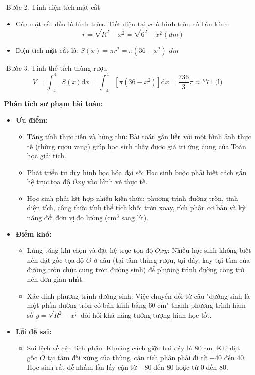 \documentclass[12pt,a4paper,oneside]{book}
\theoremstyle{theorem}
\theoremstyle{definition}
\begin{document}
-Bước 2. Tính diện tích mặt cắt
\begin{itemize}
    \item Các mặt cắt đều là hình tròn. Tiết diện tại $x$ là hình tròn có bán kính:
    \[r= \sqrt {R^2-x^2} = \sqrt{6^2-x^2} (dm)\]
    \item Diện tích mặt cắt là: $S(x)=\pi r^2=\pi (36-x^2)$ $dm$
\end{itemize}

-Bước 3. Tính thể tích thùng rượu
\[V = \int_{-4}^{4} S(x)\mathrm{d}x = \int_{-4}^{4} [\pi(36 - x^2)]\mathrm{d}x = \frac{736}{3}\pi {\approx 771\text{ (l)}}\]
\begin{center}
    \textbf{Phân tích sư phạm bài toán:}
\end{center}

\begin{itemize}
    \item \textbf{Ưu điểm:} 
    \begin{itemize}
        \item Tăng tính thực tiễn và hứng thú: Bài toán gắn liền với một hình ảnh thực tế (thùng rượu vang) giúp học sinh thấy được giá trị ứng dụng của Toán học giải tích.
        \item Phát triển tư duy hình học hóa đại số: Học sinh buộc phải biết cách gắn hệ trục tọa độ $Oxy$ vào hình vẽ thực tế.
        \item Học sinh phải kết hợp nhiều kiến thức: phương trình đường tròn, tính diện tích, công thức tính thể tích khối tròn xoay, tích phân cơ bản và kỹ năng đổi đơn vị đo lường ($\text{cm}^{3}$ sang lít).
    \end{itemize}
    \item \textbf{Điểm khó:}
    \begin{itemize}
        \item Lúng túng khi chọn và đặt hệ trục tọa độ $Oxy$: Nhiều học sinh không biết nên đặt gốc tọa độ $O$ ở đâu (tại tâm thùng rượu, tại đáy, hay tại tâm của đường tròn chứa cung tròn đường sinh) để phương trình đường cong trở nên đơn giản nhất.
        \item Xác định phương trình đường sinh: Việc chuyển đổi từ câu "đường sinh là một phần đường tròn có bán kính bằng 60 cm" thành phương trình hàm số $y = \sqrt{R^2 - x^2}$ đòi hỏi khả năng tưởng tượng hình học tốt.
    \end{itemize}
    \item \textbf{Lỗi dễ sai:}
    \begin{itemize}
        \item Sai lệch về cận tích phân: Khoảng cách giữa hai đáy là $80\text{ cm}$. Khi đặt gốc $O$ tại tâm đối xứng của thùng, cận tích phân phải đi từ $-40$ đến $40$. Học sinh rất dễ nhầm lẫn lấy cận từ $-80$ đến $80$ hoặc từ $0$ đến $80$.

\end{itemize}
\end{itemize}
\end{document}
